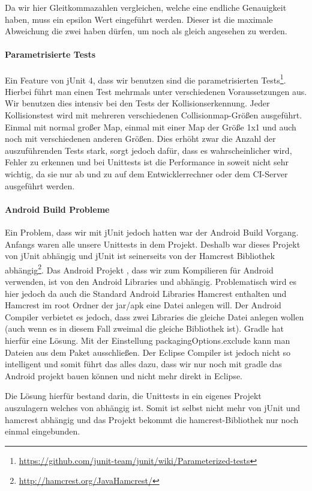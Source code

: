 Da wir hier Gleitkommazahlen vergleichen, welche eine endliche Genauigkeit haben, muss ein epsilon Wert eingeführt werden. Dieser ist die maximale Abweichung die zwei  haben dürfen, um noch als gleich angesehen zu werden.

\paragraph{Parametrisierte Tests}

Ein Feature von jUnit 4, dass wir benutzen sind die parametrisierten Tests\footnote{\url{https://github.com/junit-team/junit/wiki/Parameterized-tests}}. 
Hierbei führt man einen Test mehrmals unter verschiedenen Voraussetzungen aus. 
Wir benutzen dies intensiv bei den Tests der Kollisionserkennung. 
Jeder Kollisionstest wird mit mehreren verschiedenen Collisionmap-Größen ausgeführt. 
Einmal mit normal großer Map, einmal mit einer Map der Größe 1x1 und auch noch mit verschiedenen anderen Größen. 
Dies erhöht zwar die Anzahl der auszuführenden Tests stark, sorgt jedoch dafür, dass es wahrscheinlicher wird, Fehler zu erkennen und bei Unittests ist die Performance in soweit nicht sehr wichtig, da sie nur ab und zu auf dem Entwicklerrechner oder dem CI-Server ausgeführt werden.

\paragraph{Android Build Probleme}

Ein Problem, dass wir mit jUnit jedoch hatten war der Android Build Vorgang. 
Anfangs waren alle unsere Unittests in dem  Projekt. Deshalb war dieses Projekt von jUnit abhängig und jUnit ist seinerseits von der Hamcrest Bibliothek abhängig\footnote{\url{http://hamcrest.org/JavaHamcrest/}}. 
Das Android Projekt , dass wir zum Kompilieren für Android verwenden, ist von den Android Libraries und  abhängig.
Problematisch wird es hier jedoch da auch die Standard Android Libraries Hamcrest enthalten und Hamcrest im root Ordner der jar/apk eine Datei  anlegen will. Der Android Compiler verbietet es jedoch, dass zwei Libraries die gleiche Datei anlegen wollen (auch wenn es in diesem Fall zweimal die gleiche Bibliothek ist).
Gradle hat hierfür eine Lösung. Mit der Einstellung packagingOptions.exclude kann man Dateien aus dem Paket ausschließen. Der Eclipse Compiler ist jedoch nicht so intelligent und somit führt das alles dazu, dass wir nur noch mit gradle das Android projekt bauen können und nicht mehr direkt in Eclipse.

Die Lösung hierfür bestand darin, die Unittests in ein eigenes Projekt  auszulagern welches von  abhängig ist. Somit ist  selbst nicht mehr von jUnit und hamcrest abhängig und das Projekt  bekommt die hamcrest-Bibliothek nur noch einmal eingebunden.
